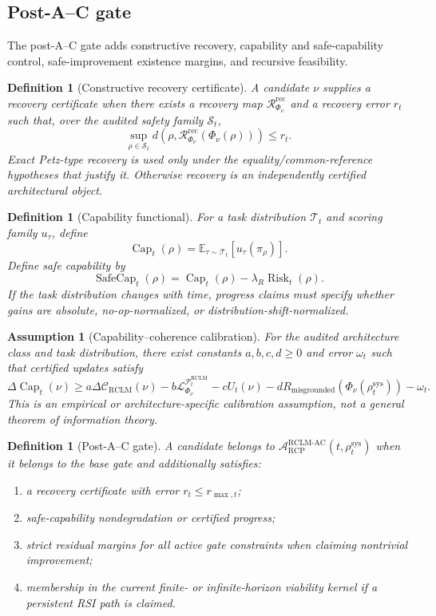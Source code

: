 \documentclass[11pt,a4paper]{article}
\newtheorem{definition}[theorem]{Definition}
\newtheorem{assumption}[theorem]{Assumption}
\newcommand{\Ccal}{\mathcal C}
\newcommand{\Lcal}{\mathcal L}
\newcommand{\Pcal}{\mathcal P}
\newcommand{\Acal}{\mathcal A}
\newcommand{\Tcal}{\mathcal T}
\newcommand{\Scal}{\mathcal S}
\newcommand{\RCP}{\mathrm{RCP}}
\newcommand{\RCLM}{\mathrm{RCLM}}
\newcommand{\AC}{\mathrm{AC}}
\newcommand{\sys}{\mathrm{sys}}
\newcommand{\rec}{\mathrm{rec}}
\providecommand{\Cap}{\operatorname{Cap}}
\newcommand{\SafeCap}{\operatorname{SafeCap}}
\newcommand{\Risk}{\operatorname{Risk}}
\newcommand{\misgrounded}{\mathrm{misgrounded}}
\begin{document}
\subsection{Post-A--C gate}

The post-A--C gate adds constructive recovery, capability and safe-capability control, safe-improvement existence margins, and recursive feasibility.

\begin{definition}[Constructive recovery certificate]
A candidate \(\nu\) supplies a recovery certificate when there exists a recovery map \(\mathcal R_{\Phi_\nu}^{\rec}\) and a recovery error \(r_t\) such that, over the audited safety family \(\Scal_t\),
\[
\sup_{\rho\in\Scal_t}
 d\!\left(\rho,\mathcal R_{\Phi_\nu}^{\rec}(\Phi_\nu(\rho))\right)
\le r_t.
\]
Exact Petz-type recovery is used only under the equality/common-reference hypotheses that justify it. Otherwise recovery is an independently certified architectural object.
\end{definition}

\begin{definition}[Capability functional]
For a task distribution \(\Tcal_t\) and scoring family \(u_\tau\), define
\[
\Cap_t(\rho)=\mathbb E_{\tau\sim\Tcal_t}[u_\tau(\pi_\rho)].
\]
Define safe capability by
\[
\SafeCap_t(\rho)=\Cap_t(\rho)-\lambda_R\Risk_t(\rho).
\]
If the task distribution changes with time, progress claims must specify whether gains are absolute, no-op-normalized, or distribution-shift-normalized.
\end{definition}

\begin{assumption}[Capability--coherence calibration]
For the audited architecture class and task distribution, there exist constants \(a,b,c,d\ge0\) and error \(\omega_t\) such that certified updates satisfy
\[
\Delta\Cap_t(\nu)
\ge
 a\Delta\Ccal_{\RCLM}(\nu)
-b\Lcal^{\Pcal_t^{\RCLM}}_{\Phi_\nu}
-cU_t(\nu)
-dR_{\misgrounded}(\Phi_\nu(\rho_t^{\sys}))
-\omega_t.
\]
This is an empirical or architecture-specific calibration assumption, not a general theorem of information theory.
\end{assumption}

\begin{definition}[Post-A--C gate]
A candidate belongs to \(\Acal_{\RCP}^{\RCLM\text{-}\AC}(t,\rho_t^{\sys})\) when it belongs to the base gate and additionally satisfies:
\begin{enumerate}[label=(\alph*),leftmargin=1.5em]
    \item a recovery certificate with error \(r_t\le r_{\max,t}\);
    \item safe-capability nondegradation or certified progress;
    \item strict residual margins for all active gate constraints when claiming nontrivial improvement;
    \item membership in the current finite- or infinite-horizon viability kernel if a persistent RSI path is claimed.
\end{enumerate}
\end{definition}
\end{document}
